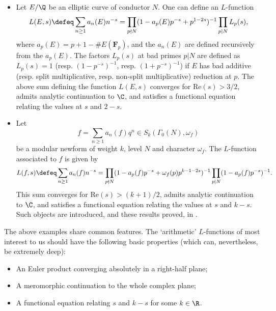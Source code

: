 \documentclass[a4paper,10pt, english, reqno]{smfart}
\numberwithin{equation}{section}
\begin{document}
\begin{itemize}
	\item Let $E/\Q$ be an elliptic curve of conductor $N$. One can define an $L$-function
	\[
	L(E,s) \defeq \sum_{n\geq 1}a_n(E)n^{-s} = \prod_{p \nmid N} (1 - a_p(E) p^{-s} + p^{1 - 2s})^{-1} \prod_{p | N} L_p(s) ,
	\]
	where $a_p(E) = p + 1 - \# E(\mathbf{F}_p)$, and the $a_n(E)$ are defined recursively from the $a_p(E)$. The factors $L_p(s)$ at bad primes $p|N$ are defined as $L_p(s) = 1$ (resp. $(1 - p^{-s})^{-1}$, resp. $ (1 + p^{-s})^{-1}$) if $E$ has bad additive (resp. split multiplicative, resp. non-split multiplicative) reduction at $p$. The above sum defining the function $L(E,s)$ converges for $\mathrm{Re}(s) > 3/2$, admits analytic continuation to $\C$, and satisfies a functional equation relating the values at $s$ and $2-s$.
	
	\item Let 
	\[
	f = \sum_{n \geq 1} a_n(f) q^n \in S_k(\Gamma_0(N), \omega_f)
	\]
	be a modular newform of weight $k$, level $N$ and character $\omega_f$. The $L$-function associated to $f$ is given by
	\[ 
	L(f, s) \defeq \sum_{n \geq 1} a_n(f) n^{-s} = \prod_{p \nmid N} (1 - a_p(f) p^{-s} + \omega_f(p) p^{k - 1 - 2s})^{-1} \prod_{p | N} (1 - a_p(f) p^{-s})^{-1}. 
	\]
	This sum converges for $\mathrm{Re}(s) > (k+1)/2$, admits analytic continuation to $\C$, and satisfies a functional equation relating the values at $s$ and $k-s$. Such objects are introduced, and these results proved, in \cite[\S5]{DS05}.
\end{itemize}

The above examples share common features. The `arithmetic' $L$-functions of most interest to us should have the following basic properties (which can, nevertheless, be extremely deep): 
\begin{itemize}
	\item[(1)] An Euler product converging absolutely in a right-half plane;
	\item[(2)] A meromorphic continuation to the whole complex plane;
	\item[(3)] A functional equation relating $s$ and $k-s$ for some $k \in \R$.
\end{itemize}
\end{document}
